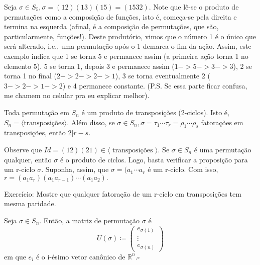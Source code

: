 \documentclass[algebra_notes.tex]{subfiles}
\begin{document}
\begin{example*}
	Seja $\sigma\in S_{5}, \sigma=(12)(13)(15) = (1532)$. Note que lê-se o produto de permutações como a composição de funções, isto é,
	começa-se pela direita e termina na esquerda (afinal, é a composição de permutações, que são, particularmente, funções!). Deste produtório, vimos que o número 1 é o único que será alterado, i.e., uma permutação após o 1 demarca o fim da ação. Assim, este
	exemplo indica que 1 se torna 5 e permanece assim (a primeira ação torna 1 no elemento 5). 5 se torna 1, depois 3 e permanece assim ($1->5->3->3$), 2 se torna 1
	no final ($2->2->2->1$), 3 se torna eventualmente 2 ($3->2->1->2$) e 4 permanece constante. (P.S. Se essa parte ficar confusa, me chamem no celular pra eu explicar melhor).
\end{example*}
\begin{prop*}
	Toda permutação em $S_{n}$ é um produto de transposições (2-ciclos). Isto é, $S_{n}=\langle\text{transposições}\rangle$.
	Além disso, se $\sigma\in S_{n}, \sigma=\tau_{1}\cdots\tau_{r} = \rho_{1}\cdots\rho_{s}$ fatorações em transposições, então $2|r-s.$
\end{prop*}
\begin{proof*}
	Observe que $Id = (12)(21)\in\langle\text{ transposições }\rangle$. Se $\sigma\in S_{n}$ é uma permutação qualquer, então $\sigma$ é
	o produto de ciclos. Logo, basta verificar a proposição para um r-ciclo $\sigma.$ Suponha, assim, que $\sigma = (a_{1}\cdots a_{r}$ é um r-ciclo.
	Com isso, $r=(a_{1}a_{r})(a_{1}a_{r-1})\cdots(a_{1}a_{2}).$ \qedsymbol
\end{proof*}
\begin{prop*}
	Exercício: Mostre que qualquer fatoração de um r-ciclo em transposições tem mesma paridade.
\end{prop*}
\begin{def*}
	Seja $\sigma\in S_{n}$. Então, a matriz de permutação $\sigma$ é
	$$
		U(\sigma)\coloneqq \begin{pmatrix}
			e_{\sigma(1)} \\
			\vdots        \\
			e_{\sigma(n)}
		\end{pmatrix}
	$$
	em que $e_{i}$ é o i-ésimo vetor can\^onico de $\mathbb{R}^{n}.\square$
\end{def*}
\end{document}
